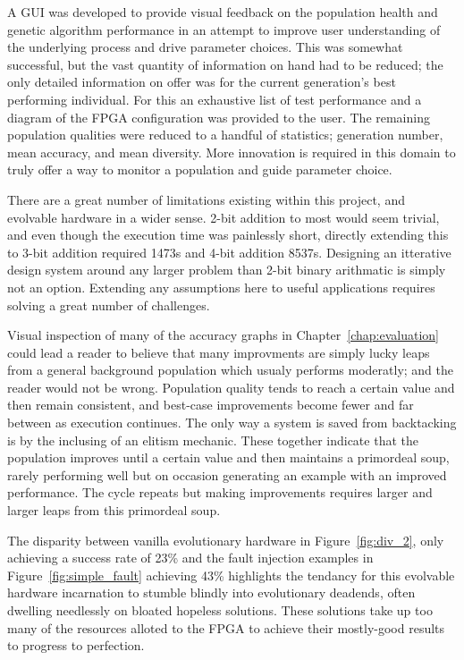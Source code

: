 A GUI was developed to provide visual feedback on the population health
and genetic algorithm performance in an attempt to improve user understanding
of the underlying process and drive parameter choices. This was somewhat successful,
but the vast quantity of information on hand had to be reduced; the only detailed
information on offer was for the current generation's best performing individual.
For this an exhaustive list of test performance and a diagram of the FPGA configuration
was provided to the user. The remaining population qualities were reduced to a handful
of statistics; generation number, mean accuracy, and mean diversity. More innovation
is required in this domain to truly offer a way to monitor a population and guide
parameter choice.

There are a great number of limitations existing within this project, and
evolvable hardware in a wider sense. 2-bit addition to most would seem trivial,
and even though the execution time was painlessly short, directly extending
this to 3-bit addition required 1473s and 4-bit addition 8537s. Designing an
itterative design system around any larger problem than 2-bit binary arithmatic
is simply not an option. Extending
any assumptions here to useful applications requires solving a great number of
challenges.

Visual inspection of many of the accuracy graphs in Chapter~\ref{chap:evaluation}
could lead a reader to believe that many improvments are simply lucky leaps from
a general background population which usualy performs moderatly; and the reader
would not be wrong. Population quality tends to reach a certain value and then
remain consistent, and best-case improvements become fewer and far between as
execution continues. The only way a system is saved from backtacking is by the
inclusing of an elitism mechanic. These together indicate that the population improves
until a certain value and then maintains a primordeal soup, rarely performing well
but on occasion generating an example with an improved performance. The cycle repeats
but making improvements requires larger and larger leaps from this primordeal soup.

The disparity between vanilla evolutionary hardware in Figure~\ref{fig:div_2}, only
achieving a success rate of 23\% and the fault injection examples in
Figure~\ref{fig:simple_fault} achieving 43\% highlights the tendancy for
this evolvable hardware incarnation to stumble blindly into evolutionary deadends,
often dwelling needlessly on bloated hopeless solutions. These solutions take up
too many of the resources alloted to the FPGA to achieve their mostly-good results
to progress to perfection.

